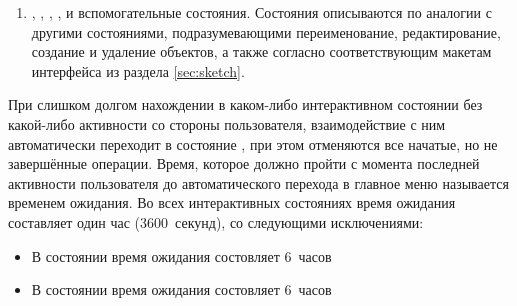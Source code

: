 \begin{enumerate}
        \item
            \label{itm:req:ui:states:rename-event}
            ,
            \label{itm:req:ui:states:edit-event-date}
            ,
            \label{itm:req:ui:states:edit-event-desc}
            ,
            \label{itm:req:ui:states:delete-event}
            ,
            \label{itm:req:ui:states:create-event}
            и вспомогательные состояния.
            Состояния описываются по аналогии с другими состояниями, подразумевающими переименование,
            редактирование, создание и удаление объектов, а также согласно соответствующим макетам интерфейса
            из раздела \ref{sec:sketch}.
    \end{enumerate}

    При слишком долгом нахождении в каком-либо интерактивном состоянии без какой-либо активности
    со стороны пользователя, взаимодействие с ним автоматически переходит в состояние
    \hyperref[itm:req:ui:states:mainmenu]
    {}, при этом отменяются все начатые, но не завершённые операции.
    Время, которое должно пройти с момента последней активности пользователя до
    автоматического перехода в главное меню называется временем ожидания. Во всех интерактивных
    состояниях время ожидания составляет один час (3600~секунд), со следующими исключениями:
    \begin{itemize}
        \item
            В состоянии
            \hyperref[itm:req:ui:states:edit-note]
            {}
            время ожидания состовляет 6~часов
        \item
            В состоянии
            \hyperref[itm:req:ui:states:create-note]
            {}
            время ожидания состовляет 6~часов
    \end{itemize}
    \endgroup
